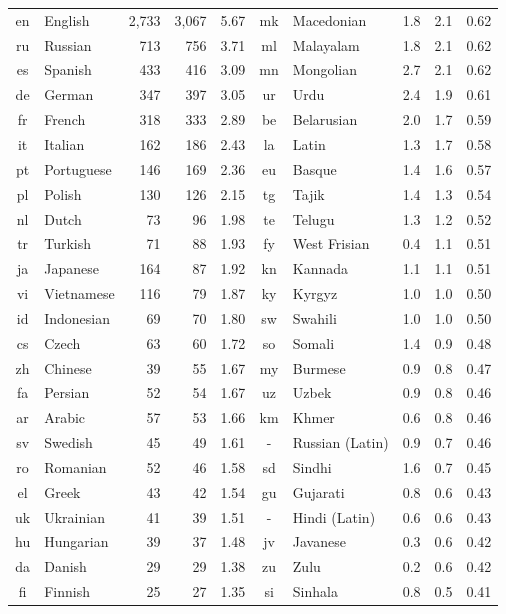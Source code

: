 \documentclass[11pt]{article}
\begin{document}
\begin{table*}[h!]
\begin{center}
\begin{tabular}[b]{clrrr|clrrr}
en & English & 2,733 & 3,067 & 5.67 & mk & Macedonian & 1.8 & 2.1 & 0.62 \\
ru & Russian & 713 & 756 & 3.71 & ml & Malayalam & 1.8 & 2.1 & 0.62 \\
es & Spanish & 433 & 416 & 3.09 & mn & Mongolian & 2.7 & 2.1 & 0.62 \\
de & German & 347 & 397 & 3.05 & ur & Urdu & 2.4 & 1.9 & 0.61 \\
fr & French & 318 & 333 & 2.89 & be & Belarusian & 2.0 & 1.7 & 0.59 \\
it & Italian & 162 & 186 & 2.43 & la & Latin & 1.3 & 1.7 & 0.58 \\
pt & Portuguese & 146 & 169 & 2.36 & eu & Basque & 1.4 & 1.6 & 0.57 \\
pl & Polish & 130 & 126 & 2.15 & tg & Tajik & 1.4 & 1.3 & 0.54 \\
nl & Dutch & 73 & 96 & 1.98 & te & Telugu & 1.3 & 1.2 & 0.52 \\
tr & Turkish & 71 & 88 & 1.93 & fy & West Frisian & 0.4 & 1.1 & 0.51 \\
ja & Japanese & 164 & 87 & 1.92 & kn & Kannada & 1.1 & 1.1 & 0.51 \\
vi & Vietnamese & 116 & 79 & 1.87 & ky & Kyrgyz & 1.0 & 1.0 & 0.50 \\
id & Indonesian & 69 & 70 & 1.80 & sw & Swahili & 1.0 & 1.0 & 0.50 \\
cs & Czech & 63 & 60 & 1.72 & so & Somali & 1.4 & 0.9 & 0.48 \\
zh & Chinese & 39 & 55 & 1.67 & my & Burmese & 0.9 & 0.8 & 0.47 \\
fa & Persian & 52 & 54 & 1.67 & uz & Uzbek & 0.9 & 0.8 & 0.46 \\
ar & Arabic & 57 & 53 & 1.66 & km & Khmer & 0.6 & 0.8 & 0.46 \\
sv & Swedish & 45 & 49 & 1.61 & - & Russian (Latin) & 0.9 & 0.7 & 0.46 \\
ro & Romanian & 52 & 46 & 1.58 & sd & Sindhi & 1.6 & 0.7 & 0.45 \\
el & Greek & 43 & 42 & 1.54 & gu & Gujarati & 0.8 & 0.6 & 0.43 \\
uk & Ukrainian & 41 & 39 & 1.51 & - & Hindi (Latin) & 0.6 & 0.6 & 0.43 \\
hu & Hungarian & 39 & 37 & 1.48 & jv & Javanese & 0.3 & 0.6 & 0.42 \\
da & Danish & 29 & 29 & 1.38 & zu & Zulu & 0.2 & 0.6 & 0.42 \\
fi & Finnish & 25 & 27 & 1.35 & si & Sinhala & 0.8 & 0.5 & 0.41 \\

\end{tabular}
\end{center}
\end{table*}
\end{document}
